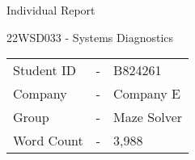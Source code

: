 
\vspace*{20mm}
\begin{center}
    \begin{Huge}
        Individual Report
    \end{Huge}

    \begin{huge}
        22WSD033 - Systems Diagnostics
    \end{huge}

    \vspace*{30mm}

    \begin{tabular}{lcl}
        Student ID  & -     & B824261       \\
        Company     & -     & Company E     \\
        Group       & -     & Maze Solver   \\
        Word Count  & -     & 3,988         \\
    \end{tabular}
\end{center}
\vspace*{10mm}


